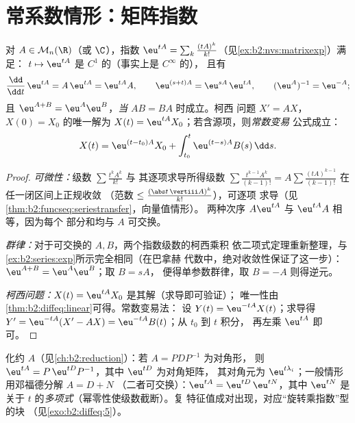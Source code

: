 \section{常系数情形：矩阵指数}

\begin{theorem}\label{thm:b2:diffeq:matrixexp}
对 $A \in \mathcal{M}_n(\R)$（或 $\C$），指数 $\eu^{tA}
= \sum_k \frac{(tA)^k}{k!}$（见\cref{ex:b2:nvs:matrixexp}）满足：
$t \mapsto \eu^{tA}$ 是 $C^1$ 的（事实上是 $C^\infty$ 的），
且有
\[
\frac{\dd}{\dd t}\,\eu^{tA} = A\,\eu^{tA} = \eu^{tA}A ,
\qquad
\eu^{(s+t)A} = \eu^{sA}\,\eu^{tA},
\qquad
(\eu^{A})^{-1} = \eu^{-A} ;
\]
且 $\eu^{A + B} = \eu^A\eu^B$，\emph{当} $AB = BA$ 时成立。柯西
问题 $X' = AX$，$X(0) = X_0$ 的唯一解为 $X(t) =
\eu^{tA}X_0$；若含源项，则\emph{常数变易}
公式成立：
\[
X(t) = \eu^{(t - t_0)A}X_0 + \int_{t_0}^{t} \eu^{(t-s)A}B(s)\,\dd
s .
\]
\end{theorem}

\begin{proof}
\emph{可微性：}级数 $\sum \frac{t^kA^k}{k!}$ 与
其逐项求导所得级数 $\sum \frac{t^{k-1}A^k}{(k-1)!} = A\sum
\frac{(tA)^{k-1}}{(k-1)!}$ 在任一闭区间上正规收敛
（范数 $\leq \frac{(\abs t\,\vertiii A)^k}{k!}$），可逐项
求导（见\cref{thm:b2:funcseq:seriestransfer}，向量值情形）。
两种次序 $A\eu^{tA}$ 与 $\eu^{tA}A$ 相等，因为每个
部分和均与 $A$ 可交换。

\emph{群律：}对于可交换的 $A, B$，两个指数级数的柯西乘积
依二项式定理重新整理，与
\cref{ex:b2:series:exp}所示完全相同（在巴拿赫
代数中，绝对收敛性保证了这一步）：$\eu^{A+B} = \eu^A\eu^B$；取 $B = sA$，
便得单参数群律，取 $B = -A$ 则得逆元。

\emph{柯西问题：}$X(t) = \eu^{tA}X_0$ 是其解（求导即可验证）；
唯一性由\cref{thm:b2:diffeq:linear}可得。常数变易法：
设 $Y(t) = \eu^{-tA}X(t)$；求导得 $Y' = \eu^{-tA}(X' -
AX) = \eu^{-tA}B(t)$；从 $t_0$ 到 $t$ 积分，
再左乘 $\eu^{tA}$ 即可。
\end{proof}

\begin{method}[计算 $\eu^{tA}$]\label{met:b2:diffeq:computeexp}
化约 $A$（见\cref{ch:b2:reduction}）：若 $A = PDP^{-1}$ 为对角形，
则 $\eu^{tA} = P\,\eu^{tD}P^{-1}$，其中 $\eu^{tD}$ 为对角矩阵，
其对角元为 $\eu^{t\lambda_i}$；一般情形用邓福德分解 $A = D + N$
（二者可交换）：$\eu^{tA} = \eu^{tD}\,\eu^{tN}$，其中 $\eu^{tN}$ 是
关于 $t$ 的\emph{多项式}（幂零性使级数截断）。复
特征值成对出现，对应“旋转乘指数”型的块
（见\cref{exo:b2:diffeq:5}）。
\end{method}

